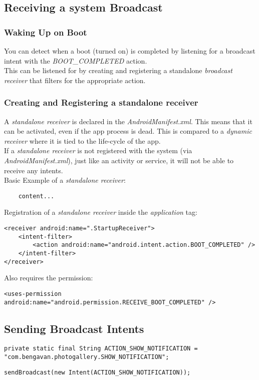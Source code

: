 \documentclass[]{article}
\renewcommand{\it}[1]{\textit{#1}}
\begin{document}
\subsection{Receiving a system Broadcast}
\subsubsection{Waking Up on Boot}
You can detect when a boot (turned on) is completed by listening for a broadcast intent with the \it{BOOT\_COMPLETED} action.
\\
This can be listened for by creating and registering a standalone \it{broadcast receiver} that filters for the appropriate action.

\subsubsection{Creating and Registering a standalone receiver}
A \it{standalone receiver} is declared in the \it{AndroidManifest.xml}.  This means that it can be activated, even if the app process is dead.  This is compared to a \it{dynamic receiver} where it is tied to the life-cycle of the app. 
\\
If a \it{standalone receiver} is not registered with the system (via \it{AndroidManifest.xml}), just like an activity or service, it will not be able to receive any intents.
\\
Basic Example of a \it{standalone receiver}:
\begin{lstlisting}
	content...
\end{lstlisting}
Registration of a \it{standalone receiver} inside the \it{application} tag:
\begin{lstlisting}
<receiver android:name=".StartupReceiver">
	<intent-filter>
		<action android:name="android.intent.action.BOOT_COMPLETED" />
	</intent-filter>
</receiver>
\end{lstlisting}
Also requires the permission:
\begin{lstlisting}
<uses-permission android:name="android.permission.RECEIVE_BOOT_COMPLETED" />
\end{lstlisting}

\subsection{Sending Broadcast Intents}
\begin{lstlisting}
private static final String ACTION_SHOW_NOTIFICATION = "com.bengavan.photogallery.SHOW_NOTIFICATION";
\end{lstlisting}
\begin{lstlisting}
sendBroadcast(new Intent(ACTION_SHOW_NOTIFICATION));
\end{lstlisting}
\end{document}
